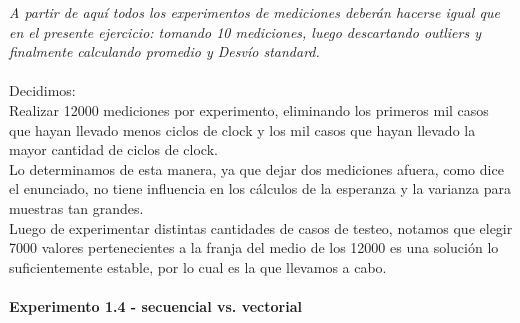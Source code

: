 \textit{A partir de aquí todos los experimentos de mediciones deberán hacerse igual 
que en el presente ejercicio: tomando 10 mediciones, luego descartando 
outliers y finalmente calculando promedio y Desvío standard.}\\
\\
Decidimos: \\
Realizar 12000 mediciones por experimento, eliminando los primeros mil casos que hayan llevado menos ciclos de clock y los mil casos que hayan llevado la mayor cantidad de ciclos de clock. \\
Lo determinamos de esta manera, ya que dejar dos mediciones afuera, como dice el enunciado, no tiene influencia en los c\'alculos de la esperanza y la varianza para muestras tan grandes. \\
Luego de experimentar distintas cantidades de casos de testeo, notamos que elegir 7000 valores pertenecientes a la franja del medio de los 12000 es una soluci\'on lo suficientemente estable, por lo cual es la que llevamos a cabo. \\
\\
\noindent\textbf{Experimento 1.4 - secuencial vs. vectorial}

